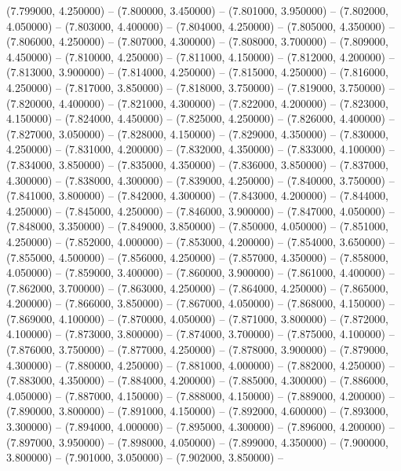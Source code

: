 (7.799000, 4.250000) -- 
(7.800000, 3.450000) -- 
(7.801000, 3.950000) -- 
(7.802000, 4.050000) -- 
(7.803000, 4.400000) -- 
(7.804000, 4.250000) -- 
(7.805000, 4.350000) -- 
(7.806000, 4.250000) -- 
(7.807000, 4.300000) -- 
(7.808000, 3.700000) -- 
(7.809000, 4.450000) -- 
(7.810000, 4.250000) -- 
(7.811000, 4.150000) -- 
(7.812000, 4.200000) -- 
(7.813000, 3.900000) -- 
(7.814000, 4.250000) -- 
(7.815000, 4.250000) -- 
(7.816000, 4.250000) -- 
(7.817000, 3.850000) -- 
(7.818000, 3.750000) -- 
(7.819000, 3.750000) -- 
(7.820000, 4.400000) -- 
(7.821000, 4.300000) -- 
(7.822000, 4.200000) -- 
(7.823000, 4.150000) -- 
(7.824000, 4.450000) -- 
(7.825000, 4.250000) -- 
(7.826000, 4.400000) -- 
(7.827000, 3.050000) -- 
(7.828000, 4.150000) -- 
(7.829000, 4.350000) -- 
(7.830000, 4.250000) -- 
(7.831000, 4.200000) -- 
(7.832000, 4.350000) -- 
(7.833000, 4.100000) -- 
(7.834000, 3.850000) -- 
(7.835000, 4.350000) -- 
(7.836000, 3.850000) -- 
(7.837000, 4.300000) -- 
(7.838000, 4.300000) -- 
(7.839000, 4.250000) -- 
(7.840000, 3.750000) -- 
(7.841000, 3.800000) -- 
(7.842000, 4.300000) -- 
(7.843000, 4.200000) -- 
(7.844000, 4.250000) -- 
(7.845000, 4.250000) -- 
(7.846000, 3.900000) -- 
(7.847000, 4.050000) -- 
(7.848000, 3.350000) -- 
(7.849000, 3.850000) -- 
(7.850000, 4.050000) -- 
(7.851000, 4.250000) -- 
(7.852000, 4.000000) -- 
(7.853000, 4.200000) -- 
(7.854000, 3.650000) -- 
(7.855000, 4.500000) -- 
(7.856000, 4.250000) -- 
(7.857000, 4.350000) -- 
(7.858000, 4.050000) -- 
(7.859000, 3.400000) -- 
(7.860000, 3.900000) -- 
(7.861000, 4.400000) -- 
(7.862000, 3.700000) -- 
(7.863000, 4.250000) -- 
(7.864000, 4.250000) -- 
(7.865000, 4.200000) -- 
(7.866000, 3.850000) -- 
(7.867000, 4.050000) -- 
(7.868000, 4.150000) -- 
(7.869000, 4.100000) -- 
(7.870000, 4.050000) -- 
(7.871000, 3.800000) -- 
(7.872000, 4.100000) -- 
(7.873000, 3.800000) -- 
(7.874000, 3.700000) -- 
(7.875000, 4.100000) -- 
(7.876000, 3.750000) -- 
(7.877000, 4.250000) -- 
(7.878000, 3.900000) -- 
(7.879000, 4.300000) -- 
(7.880000, 4.250000) -- 
(7.881000, 4.000000) -- 
(7.882000, 4.250000) -- 
(7.883000, 4.350000) -- 
(7.884000, 4.200000) -- 
(7.885000, 4.300000) -- 
(7.886000, 4.050000) -- 
(7.887000, 4.150000) -- 
(7.888000, 4.150000) -- 
(7.889000, 4.200000) -- 
(7.890000, 3.800000) -- 
(7.891000, 4.150000) -- 
(7.892000, 4.600000) -- 
(7.893000, 3.300000) -- 
(7.894000, 4.000000) -- 
(7.895000, 4.300000) -- 
(7.896000, 4.200000) -- 
(7.897000, 3.950000) -- 
(7.898000, 4.050000) -- 
(7.899000, 4.350000) -- 
(7.900000, 3.800000) -- 
(7.901000, 3.050000) -- 
(7.902000, 3.850000) -- 

